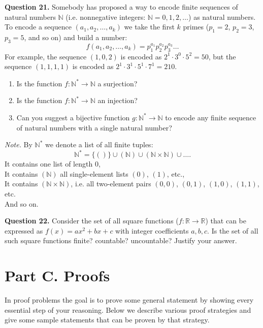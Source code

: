 \documentclass[jou]{apa6}
\begin{document}
\vspace{6pt}
{\bf Question 21.} Somebody has proposed a way to encode finite sequences of natural numbers $\mathbb{N}$
(i.e. nonnegative integers: $\mathbb{N} = 0,1,2,\ldots$) as natural numbers. 
To encode a sequence $(a_1,a_2,\ldots,a_k)$ we take the first $k$ primes
($p_1 = 2$, $p_2 = 3$, $p_3 = 5$, and so on) and build a number: 
$$f(a_1,a_2,\ldots,a_k) = p_1^{a_1}p_2^{a_2}p_3^{a_3}\ldots$$
For example, the sequence $(1,0,2)$ is encoded as $2^1\cdot{} 3^0 \cdot 5^2 = 50$, 
but the sequence $(1,1,1,1)$ is encoded as $2^1 \cdot 3^1 \cdot 5^1 \cdot 7^1 =  210$.
\begin{enumerate}
\item Is the function $f: \mathbb{N}^{\ast} \rightarrow \mathbb{N}$ a surjection?
\item Is the function $f: \mathbb{N}^{\ast} \rightarrow \mathbb{N}$ an injection?
\item Can you suggest a bijective function $g: \mathbb{N}^{\ast} \rightarrow \mathbb{N}$ to encode any finite sequence of natural numbers 
with a single natural number?
\end{enumerate}

{\em Note.} By $\mathbb{N}^{\ast}$ we denote a list of all finite tuples: 
$$\mathbb{N}^{\ast} = \{()\} \cup (\mathbb{N}) \cup (\mathbb{N} \times \mathbb{N}) \cup \ldots.$$
It contains one list of length $0$,\\
It contains $(\mathbb{N})$ all single-element lists $(0)$, $(1)$, etc.,\\
It contains $(\mathbb{N} \times \mathbb{N})$, i.e. all two-element pairs $(0,0)$, $(0,1)$, $(1,0)$, $(1,1)$, etc.\\
And so on.

\vspace{6pt}
{\bf Question 22.} Consider the set of all square functions ($f:\mathbb{R} \rightarrow \mathbb{R}$)
that can be expressed as $f(x) = ax^2 + bx + c$ with integer coefficients $a,b,c$. 
Is the set of all such square functions finite? countable? uncountable? 
Justify your answer.





\section{Part C. Proofs}

In proof problems the goal is to prove some general statement by 
showing every essential step of your reasoning.
Below we describe various proof strategies and give some sample
statements that can be proven by that strategy.
\end{document}
